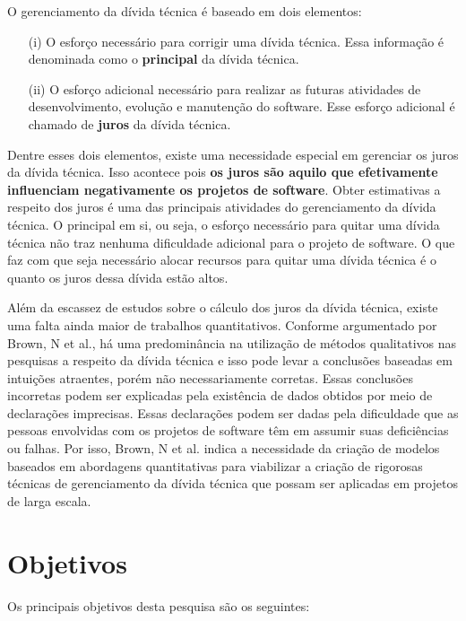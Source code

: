 O gerenciamento da dívida técnica é baseado em dois elementos:
\begin{itemize}
\item[(i)] O esforço necessário para corrigir uma dívida técnica. Essa informação é denominada como o \textbf{principal} da dívida técnica.
\item[(ii)] O esforço adicional necessário para realizar as futuras atividades de desenvolvimento, evolução e manutenção do software.  Esse esforço adicional é chamado de \textbf{juros} da dívida técnica.
\end{itemize}
 
Dentre esses dois elementos, existe uma necessidade especial em gerenciar os juros da dívida técnica. Isso acontece pois \textbf{os juros são aquilo que efetivamente influenciam negativamente os projetos de software}.  Obter estimativas a respeito dos juros é uma das principais atividades do gerenciamento da dívida técnica. O principal em si, ou seja, o esforço necessário para quitar uma dívida técnica não traz nenhuma dificuldade adicional para o projeto de software. O que faz com que seja necessário alocar recursos para quitar uma dívida técnica é o quanto os juros dessa dívida estão altos. 

Além da escassez de estudos sobre o cálculo dos juros da dívida técnica, existe uma falta ainda maior de trabalhos quantitativos. Conforme argumentado por Brown, N et al.\cite{brown2010managing}, há uma predominância na utilização de métodos qualitativos nas pesquisas a respeito da dívida técnica e isso pode levar a conclusões baseadas em intuições atraentes, porém não necessariamente corretas. Essas conclusões incorretas podem ser explicadas pela existência de dados obtidos por meio de declarações imprecisas. Essas declarações podem ser dadas pela dificuldade que as pessoas envolvidas com os projetos de software têm em assumir suas deficiências ou falhas. Por isso, Brown, N et al.\cite{brown2010managing} indica a necessidade da criação de modelos baseados em abordagens quantitativas para viabilizar a criação de rigorosas técnicas de gerenciamento da dívida técnica que possam ser aplicadas em projetos de larga escala. 


\section{Objetivos}


Os principais objetivos desta pesquisa são os seguintes:

